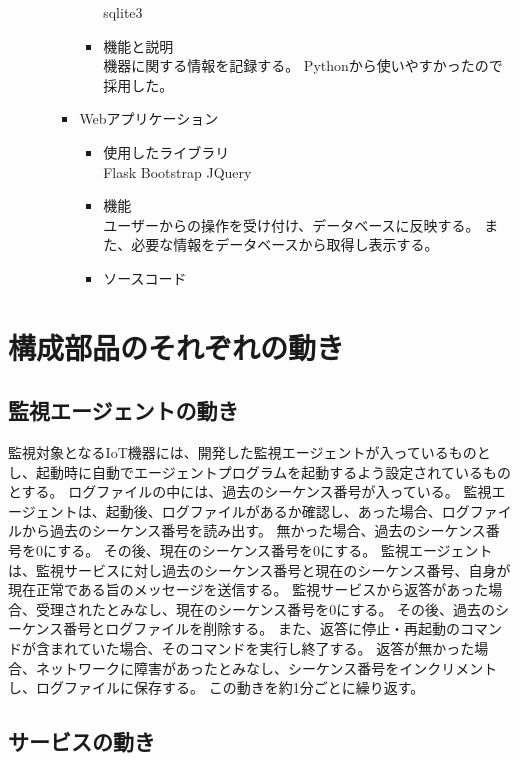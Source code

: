 \begin{itemize}
\begin{itemize}
\begin{itemize}
\begin{itemize}
								sqlite3
							\item 機能と説明\\
								機器に関する情報を記録する。
								Pythonから使いやすかったので採用した。
						\end{itemize}
					\item Webアプリケーション
						\begin{itemize}
							\item 使用したライブラリ\\
								Flask Bootstrap JQuery
							\item 機能\\
								ユーザーからの操作を受け付け、データベースに反映する。
								また、必要な情報をデータベースから取得し表示する。
							\item ソースコード\\
						\end{itemize}
				\end{itemize}
		\end{itemize}
\end{itemize}
\section{構成部品のそれぞれの動き}

\subsection{監視エージェントの動き}
監視対象となるIoT機器には、開発した監視エージェントが入っているものとし、起動時に自動でエージェントプログラムを起動するよう設定されているものとする。
ログファイルの中には、過去のシーケンス番号が入っている。
監視エージェントは、起動後、ログファイルがあるか確認し、あった場合、ログファイルから過去のシーケンス番号を読み出す。
無かった場合、過去のシーケンス番号を0にする。
その後、現在のシーケンス番号を0にする。
監視エージェントは、監視サービスに対し過去のシーケンス番号と現在のシーケンス番号、自身が現在正常である旨のメッセージを送信する。
監視サービスから返答があった場合、受理されたとみなし、現在のシーケンス番号を0にする。
その後、過去のシーケンス番号とログファイルを削除する。
また、返答に停止・再起動のコマンドが含まれていた場合、そのコマンドを実行し終了する。
返答が無かった場合、ネットワークに障害があったとみなし、シーケンス番号をインクリメントし、ログファイルに保存する。
この動きを約1分ごとに繰り返す。

\subsection{サービスの動き}
